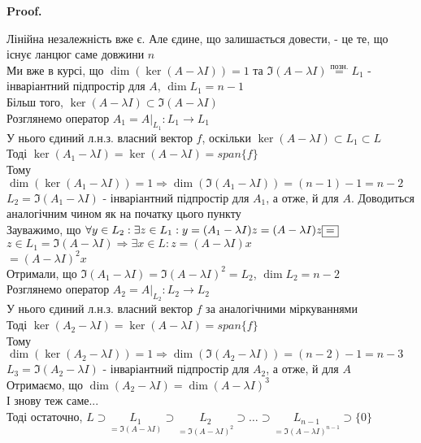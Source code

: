 \documentclass[a4paper, 10pt]{article}
\makeatletter
\theoremstyle{theoremdd}
\renewenvironment{proof}[1][Proof.\\]{\par
\pushQED{\hfill \qed}%
\normalfont \topsep6\p@\@plus6\p@\relax
\trivlist
\item\relax
{\bfseries
#1\@addpunct{.}}\hspace\labelsep\ignorespaces
}{%
\popQED\endtrivlist\@endpefalse
}
\makeatother
\begin{document}
\begin{proof}
Лінійна незалежність вже є. Але єдине, що залишається довести, - це те, що існує ланцюг саме довжини $n$\\
Ми вже в курсі, що $\dim(\ker(A-\lambda I)) = 1$ та $\Im(A-\lambda I) \overset{\textrm{позн.}}{=} L_1$ - інваріантний підпростір для $A$, $\dim L_1 = n-1$\\
Більш того, $\ker(A-\lambda I) \subset \Im(A-\lambda I)$
\bigskip \\
Розглянемо оператор $A_1 = A |_{L_1}: L_1 \to L_1$\\
У нього єдиний л.н.з. власний вектор $f$, оскільки $\ker(A-\lambda I) \subset L_1 \subset L$\\
Тоді $\ker(A_1-\lambda I) = \ker(A-\lambda I) = span\{f\}$\\
Тому $\dim(\ker(A_1 - \lambda I)) = 1 \Rightarrow \dim (\Im(A_1-\lambda I)) = (n-1)-1=n-2$\\
$L_2 = \Im(A_1-\lambda I)$ - інваріантний підпростір для $A_1$, а отже, й для $A$. Доводиться аналогічним чином як на початку цього пункту\\
Зауважимо, що $\forall y \in L_2: \exists z \in L_1: \\ y = (A_1 - \lambda I)z = (A-\lambda I)z \boxed{=}$\\
$z \in L_1 = \Im(A-\lambda I) \Rightarrow \exists x \in L: z = (A-\lambda I)x$\\
$\boxed{=} (A-\lambda I)^2 x$\\
Отримали, що $\Im(A_1 - \lambda I) = \Im(A-\lambda I)^2 = L_2$, $\dim L_2 = n-2$
\bigskip \\
Розглянемо оператор $A_2 = A |_{L_2}: L_2 \to L_2$\\
У нього єдиний л.н.з. власний вектор $f$ за аналогічними міркуваннями\\
Тоді $\ker(A_2-\lambda I) = \ker(A-\lambda I) = span\{f\}$\\
Тому $\dim(\ker(A_2 - \lambda I)) = 1 \Rightarrow \dim (\Im(A_2-\lambda I)) = (n-2)-1=n-3$\\
$L_3 = \Im(A_2-\lambda I)$ - інваріантний підпростір для $A_2$, а отже, й для $A$\\
Отримаємо, що $\dim (A_2 - \lambda I) = \dim (A-\lambda I)^3$\\
І знову теж саме...
\bigskip \\
Тоді остаточно, $L \supset \underset{=\Im(A-\lambda I)}{L_1} \supset \underset{=\Im(A-\lambda I)^2}{L_2} \supset \dots \supset \underset{=\Im(A-\lambda I)^{n-1}}{L_{n-1}} \supset \{0\}$\\

\end{proof}
\end{document}
